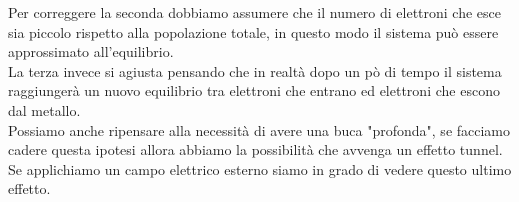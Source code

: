 Per correggere la seconda dobbiamo assumere che il numero di elettroni che esce sia piccolo rispetto alla popolazione totale, in questo modo il sistema può essere approssimato all'equilibrio.\\
La terza invece si agiusta pensando che in realtà dopo un pò di tempo il sistema raggiungerà un nuovo equilibrio tra elettroni che entrano ed elettroni che escono dal metallo.\\
Possiamo anche ripensare alla necessità di avere una buca "profonda", se facciamo cadere questa ipotesi allora abbiamo la possibilità che avvenga un effetto tunnel. Se applichiamo un campo elettrico esterno siamo in grado di vedere questo ultimo effetto.
